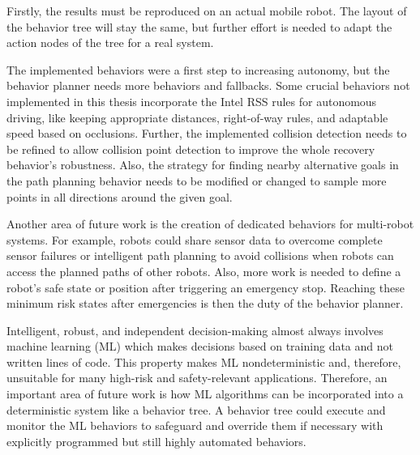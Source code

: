 Firstly, the results must be reproduced on an actual mobile robot. The layout of the behavior tree will stay the same, but further effort is needed to adapt the action nodes of the tree for a real system. 

The implemented behaviors were a first step to increasing autonomy, but the behavior planner needs more behaviors and fallbacks. Some crucial behaviors not implemented in this thesis incorporate the Intel RSS rules for autonomous driving, like keeping appropriate distances, right-of-way rules, and adaptable speed based on occlusions. Further, the implemented collision detection needs to be refined to allow collision point detection to improve the whole recovery behavior's robustness. Also, the strategy for finding nearby alternative goals in the path planning behavior needs to be modified or changed to sample more points in all directions around the given goal. 

Another area of future work is the creation of dedicated behaviors for multi-robot systems. For example, robots could share sensor data to overcome complete sensor failures or intelligent path planning to avoid collisions when robots can access the planned paths of other robots. 
Also, more work is needed to define a robot's safe state or position after triggering an emergency stop. Reaching these minimum risk states after emergencies is then the duty of the behavior planner.

Intelligent, robust, and independent decision-making almost always involves machine learning (ML) which makes decisions based on training data and not written lines of code. This property makes ML nondeterministic and, therefore, unsuitable for many high-risk and safety-relevant applications. Therefore, an important area of future work is how ML algorithms can be incorporated into a deterministic system like a behavior tree. A behavior tree could execute and monitor the ML behaviors to safeguard and override them if necessary with explicitly programmed but still highly automated behaviors.
